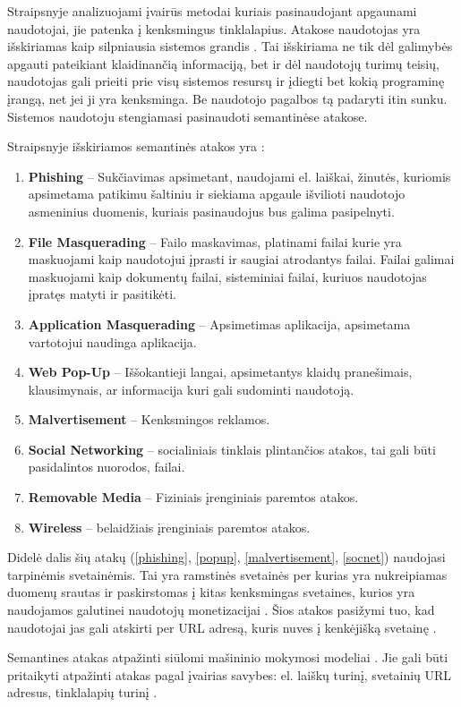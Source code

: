 Straipsnyje  analizuojami įvairūs metodai kuriais pasinaudojant apgaunami naudotojai, jie patenka į kenksmingus tinklalapius. Atakose naudotojas yra išskiriamas kaip silpniausia sistemos grandis \cite{tax}. Tai išskiriama ne tik dėl galimybės apgauti pateikiant klaidinančią informaciją, bet ir dėl naudotojų turimų teisių, naudotojas gali prieiti prie visų sistemos resursų ir įdiegti bet kokią programinę įrangą, net jei ji yra kenksminga. Be naudotojo pagalbos tą padaryti itin sunku. Sistemos naudotoju stengiamasi pasinaudoti semantinėse atakose.

Straipsnyje išskiriamos semantinės atakos yra \cite{tax}:
\begin{enumerate}
    \item \label{phishing} \textbf{Phishing} -- Sukčiavimas apsimetant, naudojami el. laiškai, žinutės, kuriomis apsimetama patikimu šaltiniu ir siekiama apgaule išvilioti naudotojo asmeninius duomenis, kuriais pasinaudojus bus galima pasipelnyti.
    \item \textbf{File Masquerading} -- Failo maskavimas, platinami failai kurie yra maskuojami kaip naudotojui įprasti ir saugiai atrodantys failai. Failai galimai maskuojami kaip dokumentų failai, sisteminiai failai, kuriuos naudotojas įpratęs matyti ir pasitikėti.
    \item \textbf{Application Masquerading} -- Apsimetimas aplikacija, apsimetama vartotojui naudinga aplikacija.
    \item \label{popup} \textbf{Web Pop-Up} -- Iššokantieji langai, apsimetantys klaidų pranešimais, klausimynais, ar informacija kuri gali sudominti naudotoją.
    \item \label{malvertisement}\textbf{Malvertisement} -- Kenksmingos reklamos.
    \item \label{socnet}\textbf{Social Networking} -- socialiniais tinklais plintančios atakos, tai gali būti pasidalintos nuorodos, failai.
    \item \textbf{Removable Media} -- Fiziniais įrenginiais paremtos atakos.
    \item \textbf{Wireless} -- belaidžiais įrenginiais paremtos atakos.
\end{enumerate}
Didelė dalis šių atakų (\ref{phishing}, \ref{popup}, \ref{malvertisement}, \ref{socnet}) naudojasi tarpinėmis svetainėmis. Tai yra ramstinės svetainės per kurias yra nukreipiamas duomenų srautas ir paskirstomas į kitas kenksmingas svetaines, kurios yra naudojamos galutinei naudotojų monetizacijai \cite{linchpins}. Šios atakos pasižymi tuo, kad naudotojai jas gali atskirti per URL adresą, kuris nuves į kenkėjišką svetainę \cite{tax}.

Semantines atakas atpažinti siūlomi mašininio mokymosi modeliai \cite{tax}. Jie gali būti pritaikyti atpažinti atakas pagal įvairias savybes: el. laiškų turinį, svetainių URL adresus, tinklalapių turinį \cite{tax}.